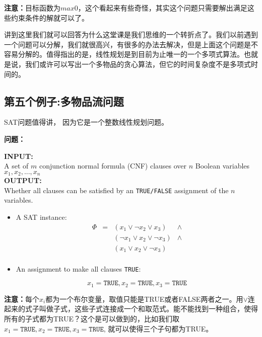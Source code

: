 \textbf{注意：}目标函数为$max  0$，这个看起来有些奇怪，其实这个问题只需要解出满足这些约束条件的解就可以了。

讲到这里我们就可以回答为什么这堂课是我们思维的一个转折点了。我们以前遇到一个问题可以分解，我们就很高兴，有很多的办法去解决，但是上面这个问题是不容易分解的。值得指出的是，线性规划是到目前为止唯一的一个多项式算法。也就是说，我们或许可以写出一个多物品的贪心算法，但它的时间复杂度不是多项式时间的。

\subsection{第五个例子:多物品流问题}

SAT问题值得讲， 因为它是一个整数线性规划问题。

\textbf{问题：}

\begin{mdframed}[leftmargin=10pt,rightmargin=10pt]
{\bf INPUT: }  \\
      A set of $m$ conjunction normal formula (CNF) clauses over $n$ Boolean variables $x_{1}, x_{2}, ..., x_{n}$ \\
     {\bf OUTPUT: } \\
      Whether all clauses can be  satisfied by an {\tt TRUE/FALSE} assignment of the $n$ variables.
\end{mdframed}

\begin{itemize}
\item
A {\sc SAT } instance:
\[
\begin{array}{rrrrl}
 \Phi & = & ( x_1 \vee \neg x_2 \vee x_3 ) & \wedge \\
      &  & ( \neg x_1 \vee  x_2 \vee \neg x_3 ) & \wedge \\
      &  & (      x_1 \vee  x_2 \vee \neg x_3 ) & \\
 \end{array} \nonumber
\]
\item
An assignment to make all clauses {\tt TRUE}:

\[
x_{1}=\texttt{TRUE}, x_{2}=\texttt{TRUE}, x_{3}=\texttt{TRUE}
\]
\end{itemize}


\textbf{注意：}每个$x_{i}$都为一个布尔变量，取值只能是TRUE或者FALSE两者之一。用$\vee$连起来的式子叫做子式，这些子式连接成一个和取范式。能不能找到一种组合，使得所有的子式都为TRUE？这个是可以做到的，比如我们取$x_{1}=\texttt{TRUE}, x_{2}=\texttt{TRUE}, x_{3}=\texttt{TRUE}$, 就可以使得三个子句都为TRUE。

